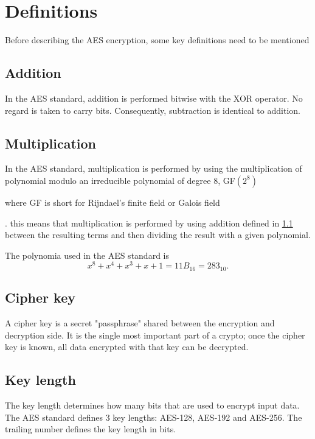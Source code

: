 \documentclass[report.tex]{subfiles}
\begin{document}
\section{Definitions}
Before describing the AES encryption, some key definitions need to be mentioned

\subsection{Addition}\label{sec:addition}
In the AES standard, addition is performed bitwise with the XOR operator. No regard is taken to carry bits. Consequently, subtraction is identical to addition.

\subsection{Multiplication}\label{sec:multiplication}
In the AES standard, multiplication is performed by using the multiplication of polynomial modulo an irreducible polynomial of degree 8, GF$\left(2^{8}\right)$ 
\begin{comment}
	\cite[Sec.~4.2]{AES Standard}
\end{comment}
where GF is short for Rijndael's finite field or Galois field 
\begin{comment}
	\cite{GF} page = http://en.wikipedia.org/wiki/Rijndael_Galois_field#Rijndael.27s_finite_field, date=2011-11-14
\end{comment}
. this means that multiplication is performed by using addition defined in \ref{sec:addition} between the resulting terms and then dividing the result with a given polynomial.

The polynomia used in the AES standard is
\begin{equation} \label{eq:multiplication polynomial}
	{x^{8} + x^{4} + x^{3} + x + 1} = 11B_{16} = 283_{10}.
\end{equation}


\subsection{Cipher key}
A cipher key is a secret "passphrase" shared between the encryption and decryption side. It is the single most important part of a crypto; once the cipher key is known, all data encrypted with that key can be decrypted.

\subsection{Key length} \label{sec:key length}
The key length determines how many bits that are used to encrypt input data. The AES standard defines 3 key lengths: AES-128, AES-192 and AES-256. The trailing number defines the key length in bits.
\end{document}
